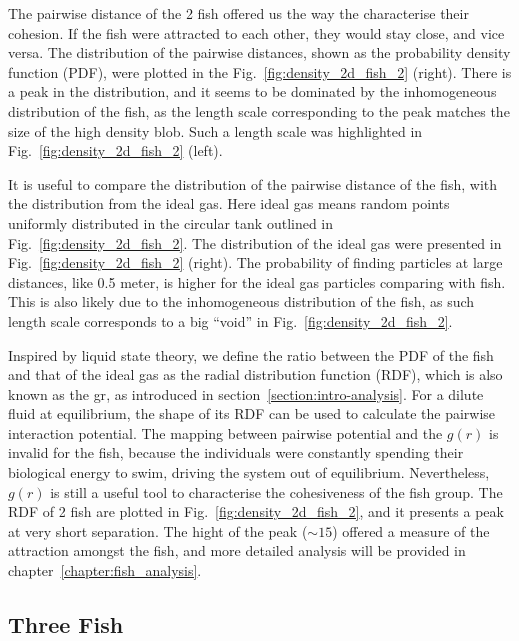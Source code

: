 \documentclass[11pt,twoside]{report}
\begin{document}
The pairwise distance of the 2 fish offered us the way the characterise their cohesion. If the fish were attracted to each other, they would stay close, and vice versa. The distribution of the pairwise distances, shown as the probability density function (PDF), were plotted in the Fig.~\ref{fig:density_2d_fish_2} (right). There is a peak in the distribution, and it seems to be dominated by the inhomogeneous distribution of the fish, as the length scale corresponding to the peak matches the size of the high density blob. Such a length scale was highlighted in Fig.~\ref{fig:density_2d_fish_2} (left).




It is useful to compare the distribution of the pairwise distance of the fish, with the distribution from the ideal gas. Here ideal gas means random points uniformly distributed in the circular tank outlined in Fig.~\ref{fig:density_2d_fish_2}. The distribution of the ideal gas were presented in Fig.~\ref{fig:density_2d_fish_2} (right). The probability of finding particles at large distances, like 0.5 meter, is higher for the ideal gas particles comparing with fish. This is also likely due to the inhomogeneous distribution of the fish, as such length scale corresponds to a big ``void'' in Fig.~\ref{fig:density_2d_fish_2}.

Inspired by liquid state theory, we define the ratio between the PDF of the fish and that of the ideal gas as the radial distribution function (\gls{RDF}), which is also known as the \gls{gr}, as introduced in section~\ref{section:intro-analysis}.
For a dilute fluid at equilibrium, the shape of its RDF can be used to calculate the pairwise interaction potential. The mapping between pairwise potential and the $g(r)$ is invalid for the fish, because the individuals were constantly spending their biological energy to swim, driving the system out of equilibrium.
Nevertheless, $g(r)$ is still a useful tool to characterise the cohesiveness of the fish group. The RDF of 2 fish are plotted in Fig.~\ref{fig:density_2d_fish_2}, and it presents a peak at very short separation. The hight of the peak ($\sim 15$) offered a measure of the attraction amongst the fish, and more detailed analysis will be provided in chapter~\ref{chapter:fish_analysis}.


\subsection{Three Fish}
\label{section:fish_3_2d}
\end{document}
